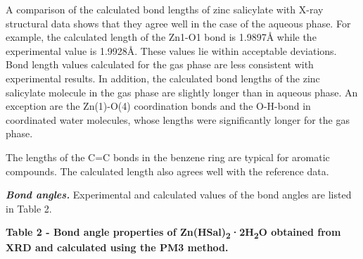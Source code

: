 A comparison of the calculated bond lengths of zinc salicylate with
X-ray structural data shows that they agree well in the case of the
aqueous phase. For example, the calculated length of the Zn1-O1 bond is
1.9897Å while the experimental value is 1.9928Å. These values lie within
acceptable deviations. Bond length values
\hspace{0pt}\hspace{0pt}calculated for the gas phase are less consistent
with experimental results. In addition, the calculated bond lengths of
the zinc salicylate molecule in the gas phase are slightly longer than
in aqueous phase. An exception are the Zn(1)-O(4) coordination bonds and
the O-H-bond in coordinated water molecules, whose lengths were
significantly longer for the gas phase.

The lengths of the C=C bonds in the benzene ring are typical for
aromatic compounds. The calculated length also agrees well with the
reference data.

{\bfseries \emph{Bond angles.}} Experimental and calculated values of the
bond angles are listed in Table 2.

{\bfseries Table 2 - Bond angle properties of
Zn(HSal)\textsubscript{2}·2H\textsubscript{2}O obtained from XRD and
calculated using the PM3 method.}

